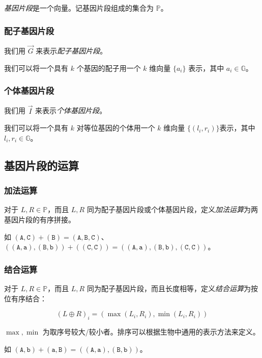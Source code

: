\documentclass{article}
\begin{document}
\textsl{基因片段}是一个向量。记基因片段组成的集合为 $\mathbb{P}$。

\subsubsection*{配子基因片段}

我们用 $\vec G$ 来表示\textsl{配子基因片段}。

我们可以将一个具有 $k$ 个基因的配子用一个 $k$ 维向量 $\{a_i\}$ 表示，其中 $a_i \in \mathbb{G}$。

\subsubsection*{个体基因片段}

我们用 $\vec I$ 来表示\textsl{个体基因片段}。

我们可以将一个具有 $k$ 对等位基因的个体用一个 $k$ 维向量 $\{(l_i,r_i)\}$表示，其中 $l_i,r_i \in \mathbb{G}$。

\subsection{基因片段的运算}

\subsubsection*{加法运算}

对于 $L,R \in \mathbb{P}$，而且 $L,R$ 同为配子基因片段或个体基因片段，定义\textsl{加法运算}为两基因片段的有序拼接。

如 $(\texttt{A},\texttt{C}) + (\texttt{B}) = (\texttt{A},\texttt{B},\texttt{C})$、$((\texttt{A},\texttt{a}),(\texttt{B},\texttt{b}))+((\texttt{C},\texttt{C}))=((\texttt{A},\texttt{a}),(\texttt{B},\texttt{b}),(\texttt{C},\texttt{C}))$。

\subsubsection*{结合运算}

对于 $L,R \in \mathbb{P}$，而且 $L,R$ 同为配子基因片段，而且长度相等，定义\textsl{结合运算}为按位有序结合：

$$(L \oplus R)_i=(\max(L_i,R_i),\min(L_i,R_i))$$

$\max,\min$ 为取序号较大/较小者。排序可以根据生物中通用的表示方法来定义。

如 $(\texttt{A},\texttt{b}) + (\texttt{a},\texttt{B})=((\texttt{A},\texttt{a}),(\texttt{B},\texttt{b}))$。
\end{document}
